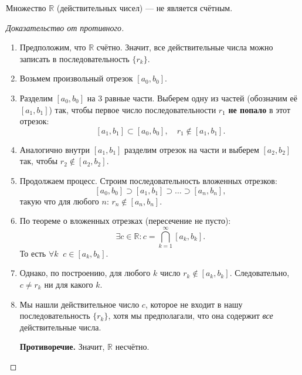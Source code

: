 \begin{statement}
    Множество $\mathbb{R}$ (действительных чисел) — не является счётным.
\end{statement}

\begin{proof}[Доказательство от противного]
    \begin{enumerate}
        \item Предположим, что $\mathbb{R}$ счётно. Значит, все действительные числа можно записать в последовательность $\{r_k\}$.
        \item Возьмем произвольный отрезок $[a_0, b_0]$.
        \item Разделим $[a_0, b_0]$ на 3 равные части. Выберем одну из частей (обозначим её $[a_1, b_1]$) так, чтобы первое число последовательности $r_1$ \textbf{не попало} в этот отрезок:
        \[ [a_1, b_1] \subset [a_0, b_0], \quad r_1 \notin [a_1, b_1]. \]
        \item Аналогично внутри $[a_1, b_1]$ разделим отрезок на части и выберем $[a_2, b_2]$ так, чтобы $r_2 \notin [a_2, b_2]$.
        \item Продолжаем процесс. Строим последовательность вложенных отрезков:
        \[ [a_0, b_0] \supset [a_1, b_1] \supset \dots \supset [a_n, b_n], \]
        такую что для любого $n$: $r_n \notin [a_n, b_n]$.
        \item По теореме о вложенных отрезках (пересечение не пусто):
        \[ \exists c \in \mathbb{R}: c = \bigcap_{k=1}^{\infty} [a_k, b_k]. \]
        То есть $\forall k \;\; c \in [a_k, b_k]$.
        \item Однако, по построению, для любого $k$ число $r_k \notin [a_k, b_k]$.
        Следовательно, $c \neq r_k$ ни для какого $k$.
        \item Мы нашли действительное число $c$, которое не входит в нашу последовательность $\{r_k\}$, хотя мы предполагали, что она содержит \textit{все} действительные числа.
        
        \textbf{Противоречие.} Значит, $\mathbb{R}$ несчётно.
    \end{enumerate}
\end{proof}


